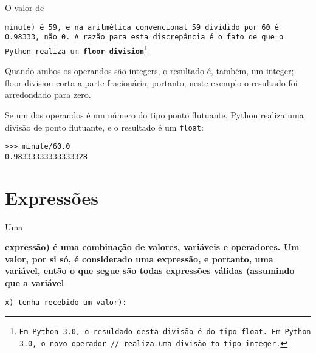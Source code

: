 {{{{{{{{{{O valor de {\tt minute) é 59, e na aritmética convencional 59 
dividido por 60 é 0.98333, não 0. A razão para esta discrepância é 
o fato de que o Python realiza um {\bf floor division}\footnote{Em Python 3.0,
o resuldado desta divisão é do tipo {\tt float}.  
Em Python 3.0, o novo operador 
{\tt //} realiza uma divisão to tipo integer.}


Quando ambos os operandos são integers, o resultado é, também,
um integer; floor division corta a parte fracionária,
portanto, neste exemplo o resultado foi arredondado para zero.

Se um dos operandos é um número do tipo ponto flutuante, Python realiza 
uma divisão de ponto flutuante, e o resultado é um {\tt float}:

\beforeverb
\begin{verbatim}
>>> minute/60.0
0.98333333333333328
\end{verbatim}
\afterverb

\section{Expressões}

Uma {\bf expressão) é uma combinação de valores, variáveis e operadores. 
Um valor, por si só, é considerado uma expressão, e portanto,
uma variável, então o que segue são todas expressões válidas 
(assumindo que a variável {\tt x) tenha recebido um valor):

}}}}}}}}}}}}}
